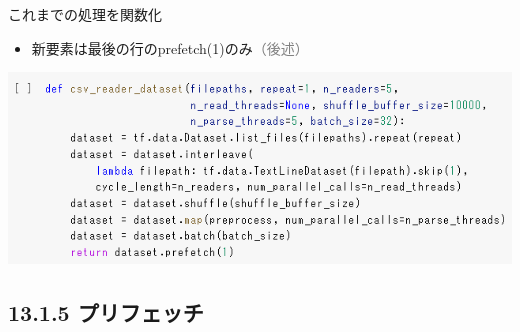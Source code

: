 \documentclass[aspectratio=169, dvipdfmx, 14pt, xcolor={svgnames,dvipsnames}, t]{beamer}
\begin{document}
\begin{frame}{これまでの処理を関数化}

  \begin{itemize}
    \tightlist
    \item
          新要素は最後の行のprefetch(1)のみ\textcolor{gray}{（後述）}
  \end{itemize}

  \centering
  \includegraphics[width=400pt]{img/hands-on-ml_13-1-4_1.png}

\end{frame}


\hypertarget{ux30d7ux30eaux30d5ux30a7ux30c3ux30c1}{%
  \subsection{13.1.5 プリフェッチ}\label{ux30d7ux30eaux30d5ux30a7ux30c3ux30c1}}

\end{document}
